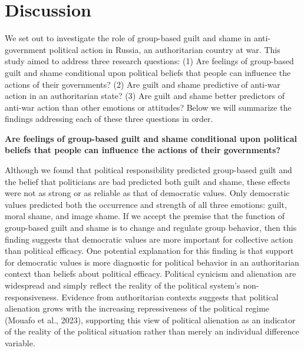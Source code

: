 \documentclass[
]{article}
\begin{document}
\allsectionsfont{\centering}

\section*{Discussion}\label{discussion}

We set out to investigate the role of group-based guilt and shame in anti-government political action in Russia, an authoritarian country at war. This study aimed to address three research questions: (1) Are feelings of group-based guilt and shame conditional upon political beliefs that people can influence the actions of their governments? (2) Are guilt and shame predictive of anti-war action in an authoritarian state? (3) Are guilt and shame better predictors of anti-war action than other emotions or attitudes? Below we will summarize the findings addressing each of these three questions in order.

\textbf{Are feelings of group-based guilt and shame conditional upon political beliefs that people can influence the actions of their governments?}

Although we found that political responsibility predicted group-based guilt and the belief that politicians are bad predicted both guilt and shame, these effects were not as strong or as reliable as that of democratic values. Only democratic values predicted both the occurrence and strength of all three emotions: guilt, moral shame, and image shame. If we accept the premise that the function of group-based guilt and shame is to change and regulate group behavior, then this finding suggests that democratic values are more important for collective action than political efficacy. One potential explanation for this finding is that support for democratic values is more diagnostic for political behavior in an authoritarian context than beliefs about political efficacy. Political cynicism and alienation are widespread and simply reflect the reality of the political system's non-responsiveness. Evidence from authoritarian contexts suggests that political alienation grows with the increasing repressiveness of the political regime (Mouafo et al., 2023), supporting this view of political alienation as an indicator of the reality of the political situation rather than merely an individual difference variable.
\end{document}
